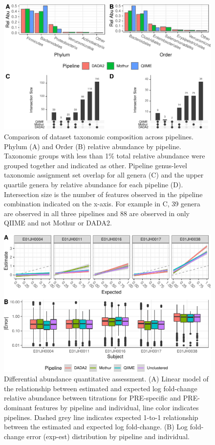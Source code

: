\documentclass[12pt]{article}
\begin{document}
\begin{figure}
\centering
\includegraphics[width=0.9\linewidth]{pipeTaxa-1.pdf}
\caption{\label{fig:pipeTaxa} Comparison of dataset taxonomic composition
across pipelines. Phylum (A) and Order (B) relative abundance by
pipeline. Taxonomic groups with less than 1\% total relative abundance
were grouped together and indicated as other. Pipeline genus-level
taxonomic assignment set overlap for all genera (C) and the upper
quartile genera by relative abundance for each pipeline (D). Intersection size is
the number of features observed in the pipeline combination indicated on the x-axis.
For example in C, 39 genera are observed in all three pipelines and
88 are observed in only QIIME and not Mothur or DADA2.}
\end{figure}

\begin{figure}
\centering
\includegraphics[width=0.9\linewidth]{logFCerror-1.pdf}
\caption{\label{fig:logFCerror} Differential abundance quantitative assessment. (A) Linear model of the relationship between
estimated and expected log fold-change relative abundance between titrations for PRE-specific and
PRE-dominant features by pipeline and individual, line color indicates
pipelines. Dashed grey line indicates expected 1-to-1 relationship
between the estimated and expected log fold-change. (B) Log fold-change
error (\textbar{}exp-est\textbar{}) distribution by pipeline and
individual.}
\end{figure}
\end{document}
